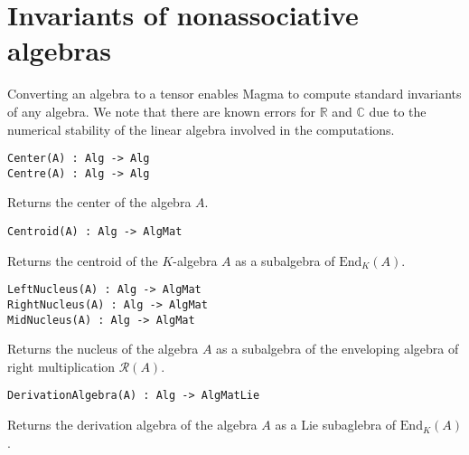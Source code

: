 
\section{Invariants of nonassociative algebras}

Converting an algebra to a tensor enables Magma to compute standard invariants of any algebra. 
We note that there are known errors for $\mathbb{R}$ and $\mathbb{C}$ due to the numerical stability of the linear algebra involved in the computations.

\color{blue}
{\small \begin{verbatim}
Center(A) : Alg -> Alg
Centre(A) : Alg -> Alg
\end{verbatim} }
\color{black}

Returns the center of the algebra $A$.

\color{blue}
{\small \begin{verbatim}
Centroid(A) : Alg -> AlgMat
\end{verbatim} }
\color{black}

Returns the centroid of the $K$-algebra $A$ as a subalgebra of $\text{End}_K(A)$.

\color{blue}
{\small \begin{verbatim}
LeftNucleus(A) : Alg -> AlgMat
RightNucleus(A) : Alg -> AlgMat
MidNucleus(A) : Alg -> AlgMat
\end{verbatim} }
\color{black}

Returns the nucleus of the algebra $A$ as a subalgebra of the enveloping algebra of right multiplication $\mathcal{R}(A)$.

\color{blue}
{\small \begin{verbatim}
DerivationAlgebra(A) : Alg -> AlgMatLie
\end{verbatim} }
\color{black}

Returns the derivation algebra of the algebra $A$ as a Lie subaglebra of $\text{End}_K(A)$.

